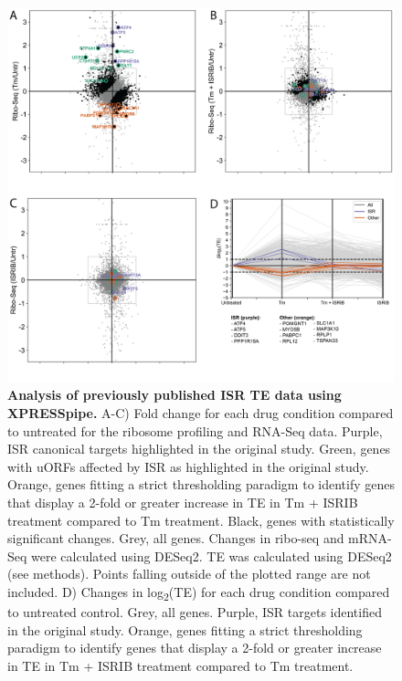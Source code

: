\documentclass[10pt, oneside]{article}
\begin{document}
\begin{figure}
\centering
  \includegraphics[width=180mm]{figures/xpresspipe_figure3.png}
  \caption{\textbf{Analysis of previously published ISR TE data using XPRESSpipe.} A-C) Fold change for each drug condition compared to untreated for the ribosome profiling and RNA-Seq data. Purple, ISR canonical targets highlighted in the original study. Green, genes with uORFs affected by ISR as highlighted in the original study. Orange, genes fitting a strict thresholding paradigm to identify genes that display a 2-fold or greater increase in TE in Tm + ISRIB treatment compared to Tm treatment. Black, genes with statistically significant changes. Grey, all genes. Changes in ribo-seq and mRNA-Seq were calculated using DESeq2. TE was calculated using DESeq2 (see methods). Points falling outside of the plotted range are not included. D) Changes in log\textsubscript{2}(TE) for each drug condition compared to untreated control. Grey, all genes. Purple, ISR targets identified in the original study. Orange, genes fitting a strict thresholding paradigm to identify genes that display a 2-fold or greater increase in TE in Tm + ISRIB treatment compared to Tm treatment.}
  \label{fig:figure3}
\end{figure}
\end{document}
